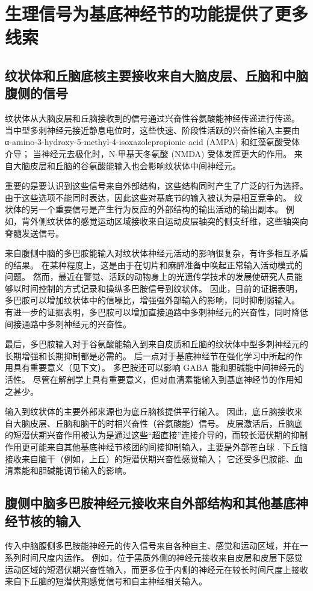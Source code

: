 \section{生理信号为基底神经节的功能提供了更多线索}
\subsection{纹状体和丘脑底核主要接收来自大脑皮层、丘脑和中脑腹侧的信号}
纹状体从大脑皮层和丘脑接收到的信号通过兴奋性谷氨酸能神经传递进行传递。 当中型多刺神经元接近静息电位时，这些快速、阶段性活跃的兴奋性输入主要由 α-amino-3-hydroxy-5-methyl-4-isoxazolepropionic acid (AMPA) 和红藻氨酸受体介导； 当神经元去极化时，N-甲基天冬氨酸 (NMDA) 受体发挥更大的作用。 来自大脑皮层和丘脑的谷氨酸能输入也会影响纹状体中间神经元。

重要的是要认识到这些信号来自外部结构，这些结构同时产生了广泛的行为选择。 由于这些选项不能同时表达，因此这些对基底节的输入被认为是相互竞争的。 纹状体的另一个重要信号是产生行为反应的外部结构的输出活动的输出副本。 例如，背外侧纹状体的感觉运动区域接收来自运动皮层轴突的侧支纤维，这些轴突向脊髓发送信号。

来自腹侧中脑的多巴胺能输入对纹状体神经元活动的影响很复杂，有许多相互矛盾的结果。 在某种程度上，这是由于在切片和麻醉准备中唤起正常输入活动模式的问题。 然而，最近在警觉、活跃的动物身上的光遗传学技术的发展使研究人员能够以时间控制的方式记录和操纵多巴胺信号到纹状体。 因此，目前的证据表明，多巴胺可以增加纹状体中的信噪比，增强强外部输入的影响，同时抑制弱输入。 有进一步的证据表明，多巴胺可以增加直接通路中多刺神经元的兴奋性，同时降低间接通路中多刺神经元的兴奋性。

最后，多巴胺输入对于谷氨酸能输入到来自皮质和丘脑的纹状体中型多刺神经元的长期增强和长期抑制都是必需的。 后一点对于基底神经节在强化学习中所起的作用具有重要意义（见下文）。 多巴胺还可以影响 GABA 能和胆碱能中间神经元的活性。 尽管在解剖学上具有重要意义，但对血清素能输入到基底神经节的作用知之甚少。

输入到纹状体的主要外部来源也为底丘脑核提供平行输入。 因此，底丘脑接收来自大脑皮层、丘脑和脑干的时相兴奋性（谷氨酸能）信号。 皮层激活后，丘脑底的短潜伏期兴奋作用被认为是通过这些“超直接”连接介导的，而较长潜伏期的抑制作用更可能来自其他基底神经节核团的间接抑制输入，主要是外部苍白球 . 下丘脑接收来自脑干（例如，上丘）的短潜伏期兴奋性感觉输入； 它还受多巴胺能、血清素能和胆碱能调节输入的影响。

\subsection{腹侧中脑多巴胺神经元接收来自外部结构和其他基底神经节核的输入}
传入中脑腹侧多巴胺能神经元的传入信号来自各种自主、感觉和运动区域，并在一系列时间尺度内运作。 例如，位于黑质外侧的神经元接收来自皮层和皮层下感觉运动区域的短潜伏期兴奋性输入，而更多位于内侧的神经元在较长时间尺度上接收来自下丘脑的短潜伏期感觉信号和自主神经相关输入。

